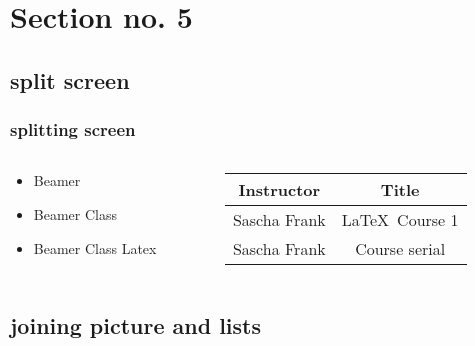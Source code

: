 \documentclass{beamer}
\begin{document}
\section{Section no. 5}
\subsection{split screen}

\begin{frame}\frametitle{splitting screen}
\begin{columns}
\begin{column}{5cm}
\begin{itemize}
\item Beamer 
\item Beamer Class 
\item Beamer Class Latex 
\end{itemize}
\end{column}
\begin{column}{5cm}
\begin{tabular}{|c|c|}
\hline
\textbf{Instructor} & \textbf{Title} \\
\hline
Sascha Frank &  \LaTeX \ Course 1 \\
\hline
Sascha Frank &  Course serial  \\
\hline
\end{tabular}
\end{column}
\end{columns}
\end{frame}


\subsection{joining picture and lists} 
\end{document}
